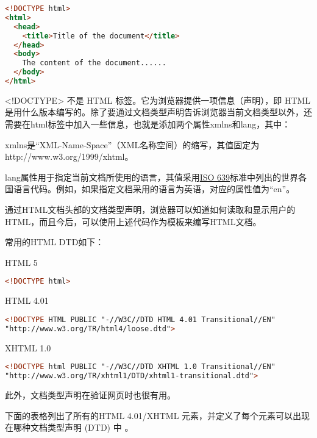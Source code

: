 \begin{lstlisting}[language=HTML]
<!DOCTYPE html>
<html>
  <head>
    <title>Title of the document</title>
  </head>
  <body>
    The content of the document......
  </body>
</html>
\end{lstlisting}


<!DOCTYPE> 不是 HTML 标签。它为浏览器提供一项信息（声明），即 HTML 是用什么版本编写的。除了要通过文档类型声明告诉浏览器当前文档类型以外，还需要在html标签中加入一些信息，也就是添加两个属性xmlns和lang，其中：

\begin{compactitem}
\item xmlns是“XML-Name-Space”（XML名称空间）的缩写，其值固定为http://www.w3.org/1999/xhtml。
\item lang属性用于指定当前文档所使用的语言，其值采用\href{http://www.w3.org/WAI/ER/IG/ert/iso639.htm#2letter}{ISO 639}标准中列出的世界各国语言代码。例如，如果指定文档采用的语言为英语，对应的属性值为“en”。
\end{compactitem}

通过HTML文档头部的文档类型声明，浏览器可以知道如何读取和显示用户的HTML，而且今后，可以使用上述代码作为模板来编写HTML文档。

常用的HTML DTD如下：

\begin{compactitem}
\item HTML 5
\begin{lstlisting}[language=HTML]
<!DOCTYPE html>
\end{lstlisting}

\item HTML 4.01
\begin{lstlisting}[language=HTML]
<!DOCTYPE HTML PUBLIC "-//W3C//DTD HTML 4.01 Transitional//EN"
"http://www.w3.org/TR/html4/loose.dtd">
\end{lstlisting}

\item XHTML 1.0
\begin{lstlisting}[language=HTML]
<!DOCTYPE html PUBLIC "-//W3C//DTD XHTML 1.0 Transitional//EN"
"http://www.w3.org/TR/xhtml1/DTD/xhtml1-transitional.dtd">
\end{lstlisting}

\end{compactitem}

此外，文档类型声明在验证网页时也很有用。


下面的表格列出了所有的HTML 4.01/XHTML 元素，并定义了每个元素可以出现在哪种文档类型声明 (DTD) 中 。


